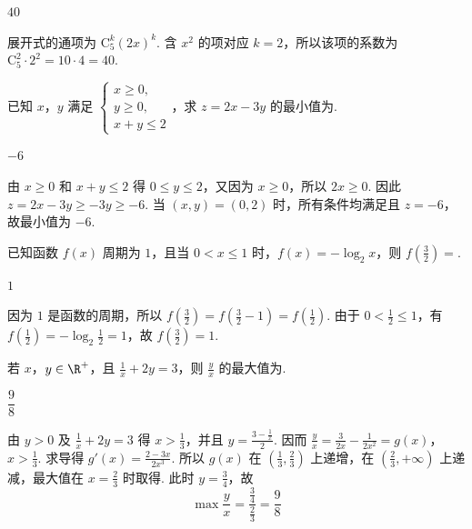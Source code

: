 \begin{answer}
\(40\)
\end{answer}

\begin{solution}
展开式的通项为 \(\mathrm C_5^k(2x)^k\). 含 \(x^2\) 的项对应 \(k=2\)，所以该项的系数为 \(\mathrm C_5^2\cdot2^2=10\cdot4=40\).
\end{solution}

\begin{problem}
已知 \(x\)，\(y\) 满足
\(
\begin{cases}
x\ge0,\\
y\ge0,\\
x+y\le2
\end{cases}
\)，求 \(z=2x-3y\) 的最小值为\fillinblank{}.
\end{problem}

\begin{answer}
\(-6\)
\end{answer}

\begin{solution}
由 \(x\ge0\) 和 \(x+y\le2\) 得 \(0\le y\le2\)，又因为 \(x\ge0\)，所以 \(2x\ge0\). 因此 \(z=2x-3y\ge-3y\ge-6\). 当 \((x,y)=(0,2)\) 时，所有条件均满足且 \(z=-6\)，故最小值为 \(-6\).
\end{solution}

\begin{problem}
已知函数 \(f(x)\) 周期为 \(1\)，且当 \(0<x\le1\) 时，\(f(x)=-\log_2x\)，则 \(f\left(\frac32\right)=\)\fillinblank{}.
\end{problem}

\begin{answer}
\(1\)
\end{answer}

\begin{solution}
因为 \(1\) 是函数的周期，所以 \(f\left(\frac32\right)=f\left(\frac32-1\right)=f\left(\frac12\right)\). 由于 \(0<\frac12\le1\)，有 \(f\left(\frac12\right)=-\log_2\frac12=1\)，故 \(f\left(\frac32\right)=1\).
\end{solution}

\begin{problem}
若 \(x\)，\(y\in\R^+\)，且 \(\frac1x+2y=3\)，则 \(\frac yx\) 的最大值为\fillinblank{}.
\end{problem}

\begin{answer}
\(\dfrac{9}{8}\)
\end{answer}

\begin{solution}
由 \(y>0\) 及 \(\frac1x+2y=3\) 得 \(x>\frac13\)，并且 \(y=\frac{3-\frac{1}{x}}{2}\). 因而
\(\frac yx=\frac{3}{2x}-\frac{1}{2x^2}=g(x)\)，\(x>\frac13\).
求导得 \(g'(x)=\frac{2-3x}{2x^3}\). 所以 \(g(x)\) 在 \(\left(\frac13,\frac23\right)\) 上递增，在 \(\left(\frac23,+\infty\right)\) 上递减，最大值在 \(x=\frac23\) 时取得. 此时 \(y=\frac34\)，故
\[
\max\frac yx=\frac{\frac{3}{4}}{\frac{2}{3}}=\frac98
\]
\end{solution}

